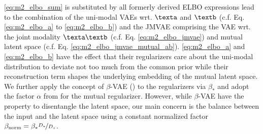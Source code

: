 %
\autoref{eq:m2_elbo_sum} is substituted by all formerly derived ELBO expressions lead to the combination of the uni-modal VAEs wrt. $\texta$ and $\textb$ (c.f. Eq. \ref{eq:m2_elbo_a} to \ref{eq:m2_elbo_b}) and the JMVAE comprising the VAE wrt. the joint modality $\texta\textb$ (c.f. Eq. \ref{eq:m2_elbo_jmvae}) and mutual latent space (c.f. Eq. \ref{eq:m2_elbo_jmvae_mutual_ab}). 
%
\autoref{eq:m2_elbo_a} and \ref{eq:m2_elbo_b} have the effect that their regularizers care about the uni-modal distribution to deviate not too much from the common prior while their reconstruction term shapes the underlying embedding of the mutual latent space.
%
We further apply the concept of $\beta$-VAE (\cite{Higgins2016,Higgins2017_2,Burgess2018}) to the regularizers via $\beta_{*}$ and adopt the factor $\alpha$ from \cite{Suzuki2017} for the mutual regularizer.
%
However, while $\beta$-VAE have the property to disentangle the latent space, our main concern is the balance between the input and the latent space using a constant normalized factor $\beta_{\text{norm}}=\beta_{*} \nicefrac{D_{*}}{D_{z}}$.

